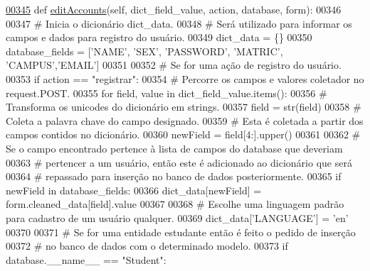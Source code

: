 \begin{DoxyCode}
\hypertarget{classAdm_1_1AdmUnit_1_1BusAdm_l00345}{}\hyperlink{classAdm_1_1AdmUnit_1_1BusAdm_a54984f999b27cdce51914ed05cd7cb42}{00345}     \textcolor{keyword}{def }\hyperlink{classAdm_1_1AdmUnit_1_1BusAdm_a54984f999b27cdce51914ed05cd7cb42}{editAccounts}(self, dict\_field\_value, action, database, form):
00346         
00347         \textcolor{comment}{# Inicia o dicionário dict\_data.
}
00348         \textcolor{comment}{#   Será utilizado para informar os campos e dados para registro do usuário.
}
00349         dict\_data = \{\}
00350         database\_fields = [\textcolor{stringliteral}{'NAME'}, \textcolor{stringliteral}{'SEX'}, \textcolor{stringliteral}{'PASSWORD'}, \textcolor{stringliteral}{'MATRIC'}, \textcolor{stringliteral}{'CAMPUS'},\textcolor{stringliteral}{'EMAIL'}]
00351 
00352         \textcolor{comment}{# Se for uma ação de registro do usuário.
}
00353         \textcolor{keywordflow}{if} action == \textcolor{stringliteral}{"registrar"}: 
00354             \textcolor{comment}{# Percorre os campos e valores coletador no request.POST.
}
00355             \textcolor{keywordflow}{for} field, value \textcolor{keywordflow}{in} dict\_field\_value.items():
00356                 \textcolor{comment}{# Transforma os unicodes do dicionário em strings.
}
00357                 field = str(field)
00358                 \textcolor{comment}{# Coleta a palavra chave do campo designado.
}
00359                 \textcolor{comment}{#   Esta é coletada a partir dos campos contidos no dicionário.
}
00360                 newField = field[4:].upper()
00361 
00362                 \textcolor{comment}{# Se o campo encontrado pertence à lista de campos do database que deveriam
}
00363                 \textcolor{comment}{# pertencer a um usuário, então este é adicionado ao dicionário que será
}
00364                 \textcolor{comment}{# repassado para inserção no banco de dados posteriormente.
}
00365                 \textcolor{keywordflow}{if} newField \textcolor{keywordflow}{in} database\_fields:
00366                     dict\_data[newField] = form.cleaned\_data[field].value
00367 
00368             \textcolor{comment}{# Escolhe uma linguagem padrão para cadastro de um usuário qualquer.
}
00369             dict\_data[\textcolor{stringliteral}{'LANGUAGE'}] = \textcolor{stringliteral}{'en'}
00370 
00371             \textcolor{comment}{# Se for uma entidade estudante então é feito o pedido de inserção 
}
00372             \textcolor{comment}{# no banco de dados com o determinado modelo.
}
00373             \textcolor{keywordflow}{if} database.\_\_name\_\_ == \textcolor{stringliteral}{"Student"}:

\end{DoxyCode}
